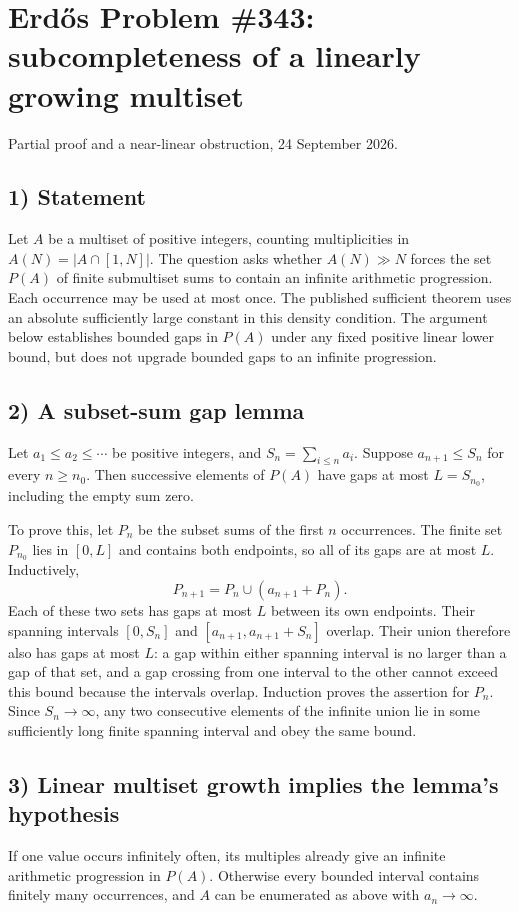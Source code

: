 \section{Erd\H{o}s Problem \#343: subcompleteness of a linearly growing multiset}
\noindent Partial proof and a near-linear obstruction, 24 September 2026.

\subsection*{1) Statement}
Let $A$ be a multiset of positive integers, counting multiplicities in $A(N)=|A\cap[1,N]|$. The question asks whether $A(N)\gg N$ forces the set $P(A)$ of finite submultiset sums to contain an infinite arithmetic progression. Each occurrence may be used at most once. The published sufficient theorem uses an absolute sufficiently large constant in this density condition. The argument below establishes bounded gaps in $P(A)$ under any fixed positive linear lower bound, but does not upgrade bounded gaps to an infinite progression.

\subsection*{2) A subset-sum gap lemma}
Let $a_1\le a_2\le\cdots$ be positive integers, and $S_n=\sum_{i\le n}a_i$. Suppose $a_{n+1}\le S_n$ for every $n\ge n_0$. Then successive elements of $P(A)$ have gaps at most $L=S_{n_0}$, including the empty sum zero.

To prove this, let $P_n$ be the subset sums of the first $n$ occurrences. The finite set $P_{n_0}$ lies in $[0,L]$ and contains both endpoints, so all of its gaps are at most $L$. Inductively,
\[P_{n+1}=P_n\cup(a_{n+1}+P_n).
\]
Each of these two sets has gaps at most $L$ between its own endpoints. Their spanning intervals $[0,S_n]$ and $[a_{n+1},a_{n+1}+S_n]$ overlap. Their union therefore also has gaps at most $L$: a gap within either spanning interval is no larger than a gap of that set, and a gap crossing from one interval to the other cannot exceed this bound because the intervals overlap. Induction proves the assertion for $P_n$. Since $S_n\to\infty$, any two consecutive elements of the infinite union lie in some sufficiently long finite spanning interval and obey the same bound.

\subsection*{3) Linear multiset growth implies the lemma's hypothesis}
If one value occurs infinitely often, its multiples already give an infinite arithmetic progression in $P(A)$. Otherwise every bounded interval contains finitely many occurrences, and $A$ can be enumerated as above with $a_n\to\infty$.

